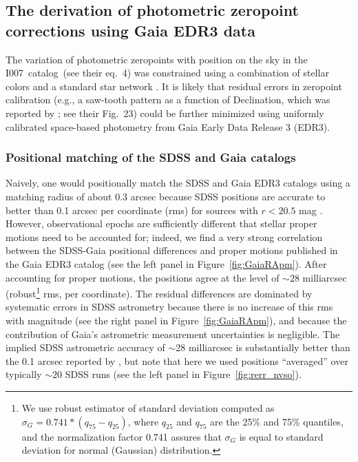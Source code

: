 \documentclass[fleqn,usenatbib]{mnras}
\newcommand{\pOc}{\hbox{I007 catalog}}
\begin{document}

\subsection{The derivation of  photometric zeropoint corrections using Gaia EDR3 data\label{sec:GaiaCorr}} 

The variation of photometric zeropoints with position on the sky in the \pOc\ (see their eq.~4) was 
constrained using a combination of stellar colors \citep[the principal axes in color-color diagrams, for details 
see][]{2004AN....325..583I} and a standard star network \citep{2002AJ....123.2121S,2006AN....327..821T}. It is likely that 
residual errors in zeropoint calibration (e.g., a saw-tooth pattern as a function of Declination,
which was reported by \citealt{2013A&A...552A.124B}; see their Fig.~23) could be further minimized using 
uniformly calibrated space-based photometry from Gaia Early Data Release 3 (EDR3). 

\subsubsection{Positional matching of the SDSS and Gaia catalogs}
Naively, one would positionally match the SDSS and Gaia EDR3 catalogs using a matching radius of 
about 0.3 arcsec because SDSS positions are accurate to better than 0.1 arcsec per coordinate (rms) 
for sources with $r < 20.5$ mag \citep{2003AJ....125.1559P}.  However, observational epochs are
sufficiently different that stellar proper motions need to be accounted for; indeed, we find a very 
strong correlation between the SDSS-Gaia positional differences and proper motions published in 
the Gaia EDR3 catalog (see the left panel in  Figure~\ref{fig:GaiaRApm}). After accounting for proper
motions,  the positions agree at the level of $\sim28$ milliarcsec (robust\footnote{We use robust estimator 
of standard deviation computed as $\sigma_G = 0.741*(q_{75}-q_{25})$, where $q_{25}$ and $q_{75}$ are 
the 25\% and 75\% quantiles, and the normalization factor 0.741 assures that $\sigma_G$ is equal to 
standard deviation for normal (Gaussian) distribution.}
rms, per coordinate). The 
residual differences are dominated by systematic errors in SDSS astrometry because there is
no increase of this rms with magnitude (see the right panel in Figure~\ref{fig:GaiaRApm}), and
because the contribution of Gaia's astrometric measurement uncertainties is negligible. 
The implied SDSS astrometric accuracy of $\sim28$ milliarcsec is substantially better than 
the 0.1 arcsec reported by \cite{2003AJ....125.1559P}, but note that here we used 
positions ``averaged'' over typically $\sim20$ SDSS runs (see the left panel in Figure~\ref{fig:rerr_nvso}). 
\end{document}

